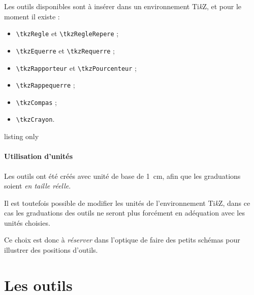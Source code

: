 \documentclass[french,a4paper,11pt]{article}
\providecommand\tikzlogo{Ti\textit{k}Z}
\let\TikZ\tikzlogo
\begin{document}
\begin{cautionblock}
Les outils disponibles sont à insérer dans un environnement \TikZ, et pour le moment il existe :
\begin{itemize}
	\item \texttt{\textbackslash tkzRegle} et \texttt{\textbackslash tkzRegleRepere} ;
	\item \texttt{\textbackslash tkzEquerre} et \texttt{\textbackslash tkzRequerre} ;
	\item \texttt{\textbackslash tkzRapporteur} et \texttt{\textbackslash tkzPourcenteur} ;
	\item \texttt{\textbackslash tkzRappequerre} ;
	\item \texttt{\textbackslash tkzCompas} ;
	\item \texttt{\textbackslash tkzCrayon}.
\end{itemize}
\vspace*{-\baselineskip}\leavevmode
\end{cautionblock}

\begin{PresentationCode}{listing only}
\tkzRegle[clés]
\tkzEquerre[clés]
\tkzRapporteur[clés]
\tkzPourcenteur[clés]
\tkzRequerre[clés]
\tkzRappEquerre[clés]
\tkzRegleRepere[clés]
\tkzCrayon[clés]
\end{PresentationCode}

\subsection{Utilisation d'unités}

\begin{tipblock}
Les outils ont été créés avec unité de base de 1~cm, afin que les graduations soient \textit{en taille réelle}.

\smallskip

Il est toutefois possible de modifier les unités de l'environnement \TikZ, dans ce cas les graduations des outils ne seront plus forcément en adéquation avec les unités choisies.

\smallskip

Ce choix est donc à \textit{réserver} dans l'optique de faire des petits schémas pour illustrer des positions d'outils.
\end{tipblock}

\pagebreak

\part{Les outils}
\end{document}
